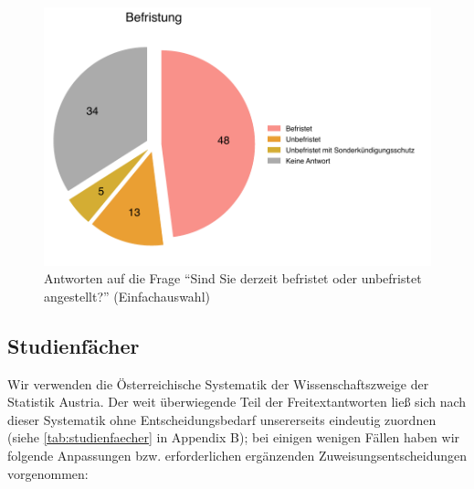 \documentclass{scrartcl}
\begin{document}
\begin{figure}[t]
   \includegraphics[width=1\textwidth]{befristung.pdf}
   \caption{Antworten auf die Frage \enquote{Sind Sie derzeit befristet oder unbefristet angestellt?} (Einfachauswahl)}
   \label{fig:befristung}
\end{figure}


\subsection{Studienfächer}\label{sec:resultate_studienfaecher}
Wir verwenden die Österreichische Systematik der Wissenschaftszweige der Statistik Austria.\autocite[Vgl.][]{statistik_austria_schlagwortverzeichnis_2023}
Der weit überwiegende Teil der Freitextantworten ließ sich nach dieser Systematik ohne Entscheidungsbedarf unsererseits eindeutig zuordnen (siehe \autoref{tab:studienfaecher} in Appendix B); bei einigen wenigen Fällen haben wir folgende Anpassungen bzw. erforderlichen ergänzenden Zuweisungsentscheidungen vorgenommen:
\end{document}
